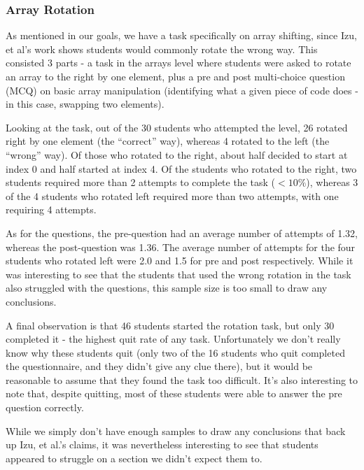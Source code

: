 \documentclass[10pt]{article}
\begin{document}
\subsubsection{Array Rotation}
As mentioned in our goals, we have a task specifically on array shifting, since Izu, et al\cite{izuloop}'s work shows students would commonly rotate the wrong way. This consisted 3 parts - a task in the arrays level where students were asked to rotate an array to the right by one element, plus a pre and post multi-choice question (MCQ) on basic array manipulation (identifying what a given piece of code does - in this case, swapping two elements).\par
Looking at the task, out of the 30 students who attempted the level, 26 rotated right by one element (the ``correct'' way), whereas 4 rotated to the left (the ``wrong'' way). Of those who rotated to the right, about half decided to start at index 0 and half started at index 4. Of the students who rotated to the right, two students required more than 2 attempts to complete the task ($<10\%$), whereas 3 of the 4 students who rotated left required more than two attempts, with one requiring 4 attempts.\par
As for the questions, the pre-question had an average number of attempts of 1.32, whereas the post-question was 1.36. The average number of attempts for the four students who rotated left were 2.0 and 1.5 for pre and post respectively. While it was interesting to see that the students that used the wrong rotation in the task also struggled with the questions, this sample size is too small to draw any conclusions.\par
A final observation is that 46 students started the rotation task, but only 30 completed it - the highest quit rate of any task. Unfortunately we don't really know why these students quit (only two of the 16 students who quit completed the questionnaire, and they didn't give any clue there), but it would be reasonable to assume that they found the task too difficult. It's also interesting to note that, despite quitting, most of these students were able to answer the pre question correctly.\par
While we simply don't have enough samples to draw any conclusions that back up Izu, et al.'s claims, it was nevertheless interesting to see that students appeared to struggle on a section we didn't expect them to.
\end{document}
